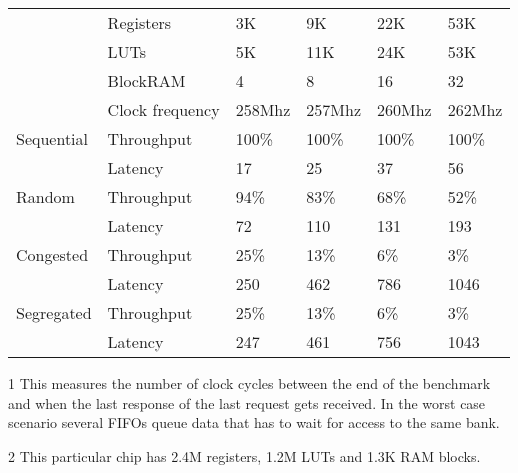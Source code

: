 \begin{table*}
\begin{threeparttable}
\begin{tabular}{|l|l|l|l|l|l|}
\hline
{}& Registers & 3K & 9K & 22K & 53K \\
                                                                      & LUTs      & 5K & 11K & 24K & 53K \\
& BlockRAM  & 4 & 8 & 16 & 32 \\
& Clock frequency & 258Mhz & 257Mhz & 260Mhz & 262Mhz \\
\hline
Sequential & Throughput & 100\%  & 100\% & 100\% & 100\% \\
& Latency  & 17 & 25 & 37 & 56 \\
Random & Throughput & 94\% & 83\% & 68\% & 52\% \\
 & Latency  & 72 & 110 & 131 & 193 \\
Congested & Throughput & 25\% & 13\% & 6\% & 3\% \\
 & Latency  & 250 & 462 & 786 & 1046 \\
Segregated & Throughput & 25\% & 13\% & 6\% & 3\% \\
 & Latency  & 247 & 461 & 756 & 1043 \\
\hline
\end{tabular}
\begin{tablenotes}
\item[1] This measures the number of clock cycles between the end of the benchmark and when the last response of the last request gets received. In the worst case scenario several FIFOs queue data that has to wait for access to the same bank.
\item[2] This particular chip has 2.4M registers, 1.2M LUTs and 1.3K RAM blocks.
\end{tablenotes}
\end{threeparttable}
\end{table*}



